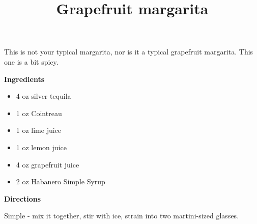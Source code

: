 \documentclass{article}
\title{Grapefruit margarita}
\begin{document}
This is not your typical margarita, nor is it a typical grapefruit margarita. This one is a bit spicy.

\bigskip

\bigskip

\textbf{Ingredients}

\begin{itemize}
    \item 4 oz silver tequila
    \item 1 oz Cointreau
    \item 1 oz lime juice
    \item 1 oz lemon juice
    \item 4 oz grapefruit juice
    \item 2 oz Habanero Simple Syrup
\end{itemize}

\bigskip

\textbf{Directions}

Simple - mix it together, stir with ice, strain into two martini-sized glasses.

\end{document}
